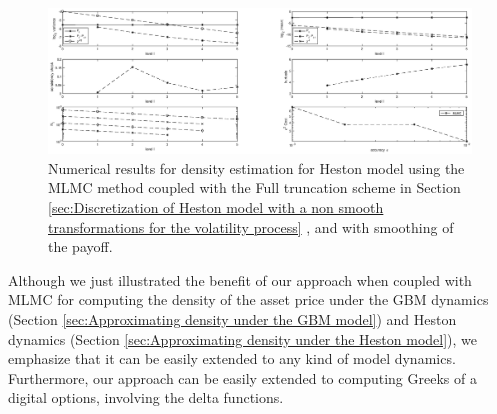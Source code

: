 \FloatBarrier

\FloatBarrier
	\begin{figure}[h!]
\centering
\includegraphics[width=1.2\linewidth]{./figures/MLMC_density_Heston_estimation/FT/digital_option_set1_L_0_8_steps_L_5.eps}

\caption{Numerical results for  density estimation  for Heston model  using the MLMC method coupled with   the Full truncation scheme in Section \ref{sec:Discretization of Heston model with a non smooth transformations for the volatility process} , and with smoothing of the payoff.}
\label{fig:Heston_density_MLMC_with_smoothing_FT}
\end{figure}
\FloatBarrier


\begin{remark}
Although we just illustrated the benefit of our approach when coupled with MLMC for computing the density  of the asset price under the GBM dynamics (Section \ref{sec:Approximating density under the GBM model}) and Heston dynamics (Section \ref{sec:Approximating density under the Heston model}), we emphasize that it can be easily extended to any kind of model dynamics. Furthermore, our approach can be easily extended to computing Greeks of a digital options, involving the delta functions.
\end{remark}
